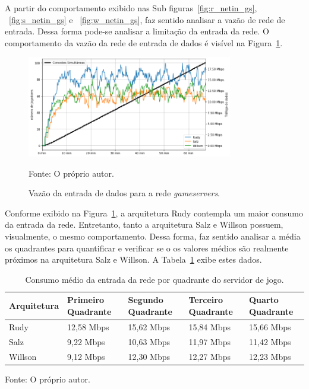 A partir do comportamento exibido nas Sub figuras~\ref{fig:r_netin_gs}, ~\ref{fig:s_netin_gs} e ~\ref{fig:w_netin_gs}, faz sentido analisar a vazão de rede de entrada.
%
Dessa forma pode-se analisar a limitação da entrada da rede.
%
O comportamento da vazão da rede de entrada de dados é visível na Figura~\ref{fig:net_in_gs}.

\begin{figure}[htb!]
  \caption{Vazão da entrada de dados para a rede \textit{gameservers}.}
  \label{fig:net_in_gs}
  \includegraphics[width=0.8\textwidth]{figuras/analise/net_in_gs.png}
  \centering

  Fonte: O próprio autor.
\end{figure}

Conforme exibido na Figura~\ref{fig:net_in_gs}, a arquitetura Rudy contempla um maior consumo da entrada da rede.
%
Entretanto, tanto a arquitetura Salz e Willson possuem, visualmente, o mesmo comportamento.
%
Dessa forma, faz sentido analisar a média os quadrantes para quantificar e verificar se o os valores médios são realmente próximos na arquitetura Salz e Willson.
%
A Tabela~\ref{tab:net_in_gs_media_quadrantes} exibe estes dados.

\begin{table}[htb!]
\centering
\begin{adjustbox}{max width=\textwidth}
\caption{Consumo médio da entrada da rede por quadrante do servidor de jogo.}
\label{tab:net_in_gs_media_quadrantes}

\begin{tabular}{l|l|l|l|l}
\hline \hline
Arquitetura & Primeiro Quadrante & Segundo Quadrante & Terceiro Quadrante & Quarto Quadrante \\ \hline \hline
Rudy        & 12,58 Mbps            & 15,62 Mbps           & 15,84 Mbps            & 15,66 Mbps          \\ \hline
Salz        & 9,22 Mbps            & 10,63 Mbps           & 11,97 Mbps            & 11,42 Mbps          \\ \hline
Willson     & 9,12 Mbps            & 12,30 Mbps          & 12,27 Mbps            & 12,23 Mbps          \\ \hline \hline
\end{tabular}
\end{adjustbox}

Fonte: O próprio autor.
\end{table}

